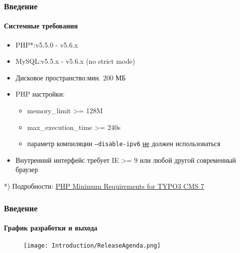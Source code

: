 \begin{frame}[fragile]
	\frametitle{Введение}
	\framesubtitle{Системные требования}

	\begin{itemize}
		\item PHP*:\tabto{4cm}v5.5.0 - v5.6.x
		\item MySQL:\tabto{4cm}v5.5.x - v5.6.x (no strict mode)
		\item Дисковое пространство:\tabto{4cm}мин. 200 МБ
		\item PHP настройки:

			\begin{itemize}
				\item memory\_limit >= 128M
				\item max\_execution\_time >= 240s
				\item параметр компиляции \texttt{--disable-ipv6} \underline{не} должен использоваться
			\end{itemize}

		\item Внутренний интерфейс требует IE >= 9 или любой другой современный браузер

	\end{itemize}

	\vspace{1cm}

	*) Подробности: \href{http://typo3.org/news/article/php-minimum-requirements-for-typo3-cms-7/}{PHP Minimum Requirements for TYPO3 CMS 7}

\end{frame}

\begin{frame}[fragile]
	\frametitle{Введение}
	\framesubtitle{График разработки и выхода}

	\begin{figure}
		\texttt{[image: Introduction/ReleaseAgenda.png]}
	\end{figure}

\end{frame}

